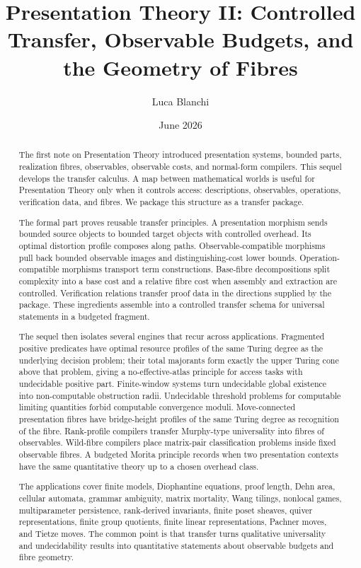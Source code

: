 \documentclass[11pt]{article}
\title{Presentation Theory II: Controlled Transfer, Observable Budgets, and the Geometry of Fibres}
\author{Luca Blanchi}
\date{June 2026}
\begin{document}
\maketitle

\begin{abstract}
The first note on Presentation Theory introduced presentation systems, bounded parts, realization fibres, observables, observable costs, and normal-form compilers. This sequel develops the transfer calculus. A map between mathematical worlds is useful for Presentation Theory only when it controls access: descriptions, observables, operations, verification data, and fibres. We package this structure as a transfer package.

The formal part proves reusable transfer principles. A presentation morphism sends bounded source objects to bounded target objects with controlled overhead. Its optimal distortion profile composes along paths. Observable-compatible morphisms pull back bounded observable images and distinguishing-cost lower bounds. Operation-compatible morphisms transport term constructions. Base-fibre decompositions split complexity into a base cost and a relative fibre cost when assembly and extraction are controlled. Verification relations transfer proof data in the directions supplied by the package. These ingredients assemble into a controlled transfer schema for universal statements in a budgeted fragment.

The sequel then isolates several engines that recur across applications. Fragmented positive predicates have optimal resource profiles of the same Turing degree as the underlying decision problem; their total majorants form exactly the upper Turing cone above that problem, giving a no-effective-atlas principle for access tasks with undecidable positive part. Finite-window systems turn undecidable global existence into non-computable obstruction radii. Undecidable threshold problems for computable limiting quantities forbid computable convergence moduli. Move-connected presentation fibres have bridge-height profiles of the same Turing degree as recognition of the fibre. Rank-profile compilers transfer Murphy-type universality into fibres of observables. Wild-fibre compilers place matrix-pair classification problems inside fixed observable fibres. A budgeted Morita principle records when two presentation contexts have the same quantitative theory up to a chosen overhead class.

The applications cover finite models, Diophantine equations, proof length, Dehn area, cellular automata, grammar ambiguity, matrix mortality, Wang tilings, nonlocal games, multiparameter persistence, rank-derived invariants, finite poset sheaves, quiver representations, finite group quotients, finite linear representations, Pachner moves, and Tietze moves. The common point is that transfer turns qualitative universality and undecidability results into quantitative statements about observable budgets and fibre geometry.
\end{abstract}
\end{document}
